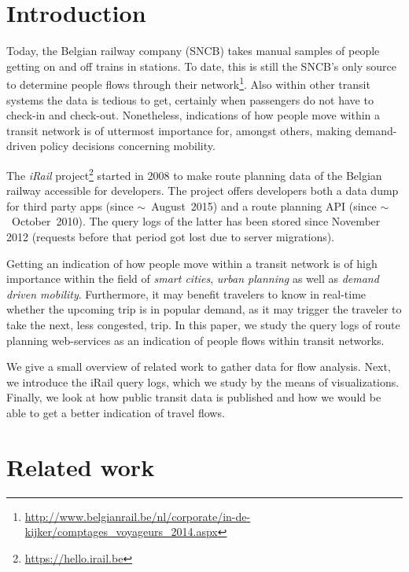 \documentclass{sig-alternate}
\begin{document}
\vspace{1em}

\section{Introduction}
\label{sec:introduction}

Today, the Belgian railway company (SNCB) takes manual samples of people getting on and off trains in stations. 
To date, this is still the SNCB's only source to determine people flows through their network\footnote{\url{http://www.belgianrail.be/nl/corporate/in-de-kijker/comptages_voyageurs_2014.aspx}}.
Also within other transit systems the data is tedious to get, certainly when passengers do not have to check-in and check-out.
Nonetheless, indications of how people move within a transit network is of uttermost importance for, amongst others, making demand-driven policy decisions concerning mobility.

The \emph{iRail} project\footnote{\url{https://hello.irail.be}} started in 2008 to make route planning data of the Belgian railway accessible for developers.
The project offers developers both a data dump for third party apps (since $\sim$~August~2015) and a route planning API (since $\sim$~October~2010).
The query logs of the latter has been stored since November 2012 (requests before that period got lost due to server migrations).

Getting an indication of how people move within a transit network is of high importance within the field of \emph{smart cities}, \emph{urban planning} as well as \emph{demand driven mobility}.
Furthermore, it may benefit travelers to know in real-time whether the upcoming trip is in popular demand, as it may trigger the traveler to take the next, less congested, trip.
In this paper, we study the query logs of route planning web-services as an indication of people flows within transit networks.

We give a small overview of related work to gather data for flow analysis.
Next, we introduce the iRail query logs, which we study by the means of visualizations.
Finally, we look at how public transit data is published and how we would be able to get a better indication of travel flows.

\section{Related work}
\label{sec:relwork}
\end{document}
